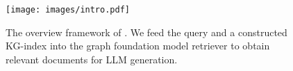 \begin{figure}[t]
    \centering
    \texttt{[image: images/intro.pdf]}
    \caption{The overview framework of \ourmethod. We feed the query and a constructed KG-index into the graph foundation model retriever to obtain relevant documents for LLM generation.}
    \label{fig:intro}
\end{figure}